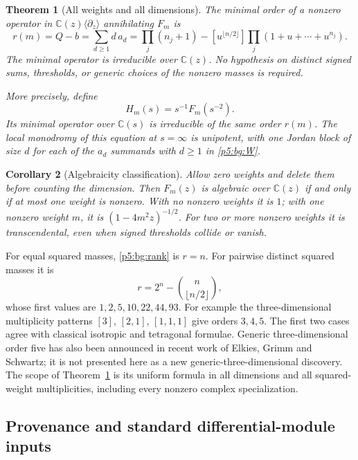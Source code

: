 \documentclass[11pt,a4paper]{article}
\newtheorem{theorem}{Theorem}[section]
\newtheorem{corollary}[theorem]{Corollary}
\theoremstyle{definition}
\theoremstyle{remark}
\numberwithin{equation}{section}
\begin{document}
\begin{theorem}[All weights and all dimensions]\label{p5:bg:main}
The minimal order of a nonzero operator in
$\mathbb C(z)\langle\partial_z\rangle$ annihilating $F_m$ is
\begin{equation}\label{p5:bg:rank}
 r(m)=Q-b=\sum_{d\ge1}d\,a_d
 =\prod_j(n_j+1)
   -[u^{\lfloor n/2\rfloor}]\prod_j(1+u+\cdots+u^{n_j}).
\end{equation}
The minimal operator is irreducible over $\mathbb C(z)$.
No hypothesis on distinct signed sums, thresholds, or generic
choices of the nonzero masses is required.

More precisely, define
\[
 H_m(s)=s^{-1}F_m(s^{-2}).
\]
Its minimal operator over $\mathbb C(s)$ is irreducible of the
same order $r(m)$.  The local monodromy of this equation at
$s=\infty$ is unipotent, with one Jordan block of size $d$ for
each of the $a_d$ summands with $d\ge1$ in \eqref{p5:bg:W}.
\end{theorem}

\begin{corollary}[Algebraicity classification]\label{p5:bg:alg}
Allow zero weights and delete them before counting the dimension.
Then $F_m(z)$ is algebraic over $\mathbb C(z)$ if and only if at
most one weight is nonzero.  With no nonzero weights it is $1$;
with one nonzero weight $m$, it is $(1-4m^2z)^{-1/2}$.
For two or more nonzero weights it is transcendental, even when
signed thresholds collide or vanish.
\end{corollary}

For equal squared masses, \eqref{p5:bg:rank} is $r=n$.
For pairwise distinct squared masses it is
\[
 r=2^n-\binom n{\lfloor n/2\rfloor},
\]
whose first values are $1,2,5,10,22,44,93$.
For example the three-dimensional multiplicity patterns
$[3]$, $[2,1]$, $[1,1,1]$ give orders $3,4,5$.
The first two cases agree with classical isotropic and tetragonal
formulae.  Generic three-dimensional order five has also been
announced in recent work of Elkies, Grimm and Schwartz; it is not
presented here as a new generic-three-dimensional discovery.
The scope of Theorem~\ref{p5:bg:main} is its uniform formula in all
dimensions and all squared-weight multiplicities, including every
nonzero complex specialization.

\subsection{Provenance and standard differential-module inputs}
\end{document}
